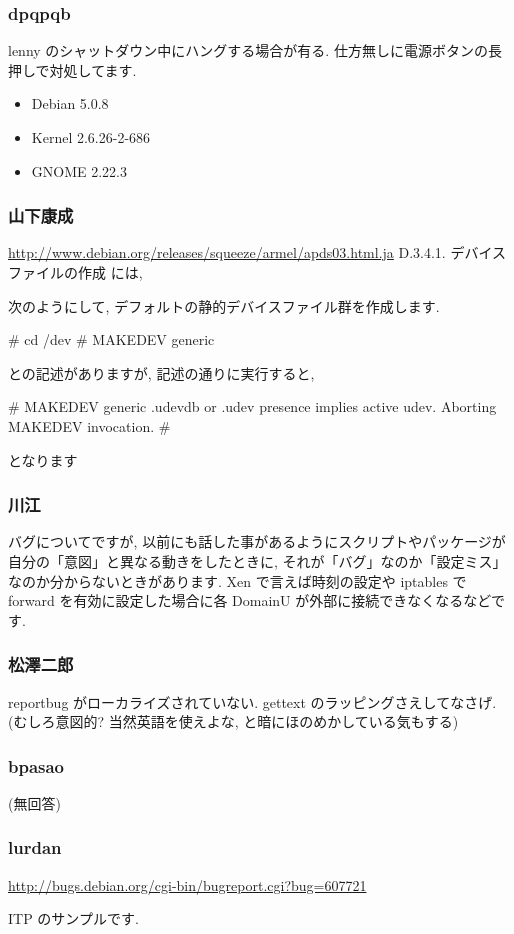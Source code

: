 \documentclass[cjk,dvipdfmx,12pt,%
hyperref={bookmarks=true,bookmarksnumbered=true,bookmarksopen=false,%
colorlinks=false,%
pdftitle={第 43 回 関西 Debian 勉強会},%
pdfauthor={倉敷・のがた・佐々木},%
pdfsubject={資料},%
}]{beamer}
\begin{document}
\begin{frame}[fragile]
\frametitle{ dpqpqb }

lenny のシャットダウン中にハングする場合が有る.
仕方無しに電源ボタンの長押しで対処してます.
\begin{itemize}
\item Debian 5.0.8
\item Kernel 2.6.26-2-686
\item GNOME  2.22.3
\end{itemize}
\end{frame}

\begin{frame}[fragile]
\frametitle{ 山下康成 }

\url{http://www.debian.org/releases/squeeze/armel/apds03.html.ja}
D.3.4.1. デバイスファイルの作成 には,
\begin{commandline}
次のようにして, デフォルトの静的デバイスファイル群を作成します.

# cd /dev
# MAKEDEV generic
\end{commandline}
との記述がありますが, 記述の通りに実行すると,
\begin{commandline}
# MAKEDEV generic
.udevdb or .udev presence implies active udev.  Aborting MAKEDEV invocation.
#
\end{commandline}
となります
\end{frame}

\begin{frame}[fragile]
\frametitle{ 川江 }

バグについてですが, 以前にも話した事があるようにスクリプトやパッケージが自分の「意図」と異なる動きをしたときに, それが「バグ」なのか「設定ミス」なのか分からないときがあります. Xen で言えば時刻の設定や iptables で forward を有効に設定した場合に各 DomainU が外部に接続できなくなるなどです.
\end{frame}

\begin{frame}[fragile]
\frametitle{ 松澤二郎 }

reportbug がローカライズされていない. gettext のラッピングさえしてなさげ.
(むしろ意図的? 当然英語を使えよな, と暗にほのめかしている気もする)
\end{frame}

\begin{frame}[fragile]
\frametitle{ bpasao }

(無回答)

\end{frame}

\begin{frame}[fragile]
\frametitle{ lurdan }

{\url{http://bugs.debian.org/cgi-bin/bugreport.cgi?bug=607721}}

ITP のサンプルです.
\end{frame}
\end{document}
